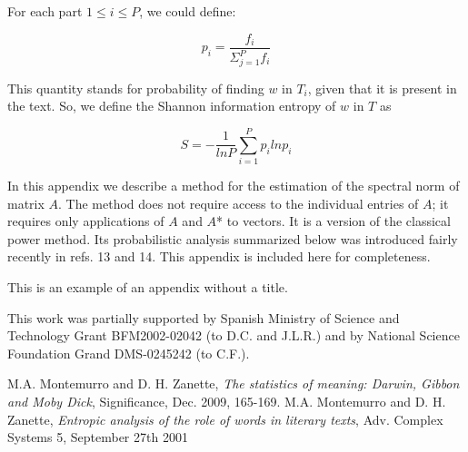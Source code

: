 \documentclass{pnastwo}
\begin{document}
\begin{article}
For each part $1 \leq i \leq P$, we could define:

\begin{equation}
  p_i = \frac{f_i}{\Sigma_{j=1}^{P}f_i}
\end{equation}

This quantity stands for probability of finding $w$ in $T_i$, given that it is present in the text. So, 
we define the Shannon information entropy of $w$ in $T$ as

\begin{equation}
  S = -\frac{1}{ln P}\sum_{i=1}^{P}p_i ln p_i
\end{equation}


In this appendix we describe a method for the estimation of the spectral norm
of matrix $A$. The method does not require access to the individual
entries of $A$; it requires only applications of $A$ and $A$* to vectors.
It is a version of the classical power method. Its probabilistic
analysis summarized below was introduced fairly recently in refs. 13
and 14. This appendix is included here for completeness.


\appendix
This is an example of an appendix without a title.

\begin{acknowledgments}
This work was partially supported by 
Spanish Ministry of Science and Technology Grant BFM2002-02042 (to D.C. and
J.L.R.) and by National Science Foundation Grand DMS-0245242 (to C.F.).
\end{acknowledgments}



\begin{thebibliography}{10}
M.A. Montemurro and D. H. Zanette, {\em The statistics of meaning: Darwin, Gibbon and Moby Dick}, Significance, Dec. 2009, 165-169.
M.A. Montemurro and D. H. Zanette, {\em Entropic analysis of the role of words in literary texts}, Adv. Complex Systems 5, September 27th 2001
\end{thebibliography}
\end{article}
\end{document}

